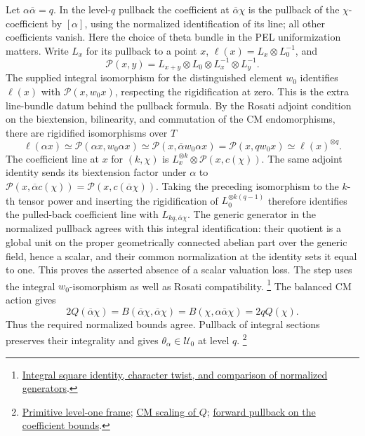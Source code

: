 Let \(\alpha\overline\alpha=q\). In the level-\(q\) pullback the
coefficient at \(\overline\alpha\chi\) is the pullback of the
\(\chi\)-coefficient by \([\alpha]\), using the normalized
identification of its line; all other coefficients vanish.
Here the choice of theta bundle in the PEL uniformization matters.
Write \(L_x\) for its pullback to a point \(x\),
\(\ell(x)=L_x\otimes L_0^{-1}\), and
\[
 \mathcal P(x,y)=L_{x+y}\otimes L_0\otimes L_x^{-1}\otimes L_y^{-1}.
\]
The supplied integral isomorphism for the distinguished element \(w_0\)
identifies \(\ell(x)\) with \(\mathcal P(x,w_0x)\), respecting the
rigidification at zero. This is the extra line-bundle datum behind the
pullback formula. By the Rosati adjoint condition on the biextension,
bilinearity, and commutation of the CM endomorphisms, there are
rigidified isomorphisms over \(T\)
\[
 \ell(\alpha x)\simeq\mathcal P(\alpha x,w_0\alpha x)
  \simeq\mathcal P(x,\overline\alpha w_0\alpha x)
  =\mathcal P(x,qw_0x)\simeq\ell(x)^{\otimes q}.
\]
The coefficient line at \(x\) for \((k,\chi)\) is
\(L_x^{\otimes k}\otimes\mathcal P(x,c(\chi))\).
The same adjoint identity sends its biextension factor under
\(\alpha\) to \(\mathcal P(x,\overline\alpha c(\chi))
=\mathcal P(x,c(\overline\alpha\chi))\). Taking the preceding
isomorphism to the \(k\)-th tensor power and inserting the
rigidification of \(L_0^{\otimes k(q-1)}\) therefore identifies
the pulled-back coefficient line with \(L_{kq,\overline\alpha\chi}\).
The generic generator in the normalized pullback agrees with this
integral identification: their quotient is a global unit on the
proper geometrically connected abelian part over the generic field,
hence a scalar, and their common normalization at the identity sets
it equal to one. This proves the asserted absence of a scalar
valuation loss. The step uses the integral \(w_0\)-isomorphism
as well as Rosati compatibility.
\footnote{\href{https://github.com/ChristianKudeba/alpoge-rh-verification/blob/alpoge-source-7cbf7a0c/src/ReciprocityTheory/ReductiveGroups/ArithmeticGeometry/DiscreteValuationRings/PullGenPf.lean}{Integral square identity, character twist, and comparison of normalized generators}.}
The balanced CM action gives
\[
    2Q(\overline\alpha\chi)
       =B(\overline\alpha\chi,\overline\alpha\chi)
       =B(\chi,\alpha\overline\alpha\chi)
       =2qQ(\chi).
\]
Thus the required normalized bounds agree. Pullback of integral
sections preserves their integrality and gives
\(\theta_\alpha\in\mathcal U_0\) at level \(q\).
\footnote{\href{https://github.com/ChristianKudeba/alpoge-rh-verification/blob/alpoge-source-7cbf7a0c/src/Development/AbelianVarietyTheory/Proofs/JetHarmonics/ExistsThetaFrame.lean}{Primitive level-one frame};
\href{https://github.com/ChristianKudeba/alpoge-rh-verification/blob/alpoge-source-7cbf7a0c/src/ReciprocityTheory/ReductiveGroups/ArithmeticGeometry/DiscreteValuationRings/QuadraticAlgebraValuation.lean}{CM scaling of \(Q\)};
\href{https://github.com/ChristianKudeba/alpoge-rh-verification/blob/alpoge-source-7cbf7a0c/src/ReciprocityTheory/ReductiveGroups/ArithmeticGeometry/DiscreteValuationRings/PullbackValuationInvarianceOf.lean}{forward pullback on the coefficient bounds}.}


